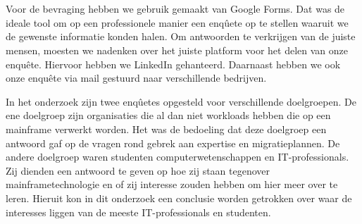 \section{}
\label{sec:De bevraging}

Voor de bevraging hebben we gebruik gemaakt van Google Forms. Dat was de ideale tool om op een professionele manier een enqûete op te stellen waaruit we de gewenste informatie konden halen. Om antwoorden te verkrijgen van de juiste mensen, moesten we nadenken over het juiste platform voor het delen van onze enquête. Hiervoor hebben we LinkedIn gehanteerd. Daarnaast hebben we ook onze enquête via mail gestuurd naar verschillende bedrijven. 

In het onderzoek zijn twee enqûetes opgesteld voor verschillende doelgroepen. De ene doelgroep zijn organisaties die al dan niet workloads hebben die op een mainframe verwerkt worden. Het was de bedoeling dat deze doelgroep een antwoord gaf op de vragen rond gebrek aan expertise en migratieplannen. De andere doelgroep waren studenten computerwetenschappen en IT-professionals. Zij dienden een antwoord te geven op hoe zij staan tegenover mainframetechnologie en of zij interesse zouden hebben om hier meer over te leren. Hieruit kon in dit onderzoek een conclusie worden getrokken over waar de interesses liggen van de meeste IT-professionals en studenten.

